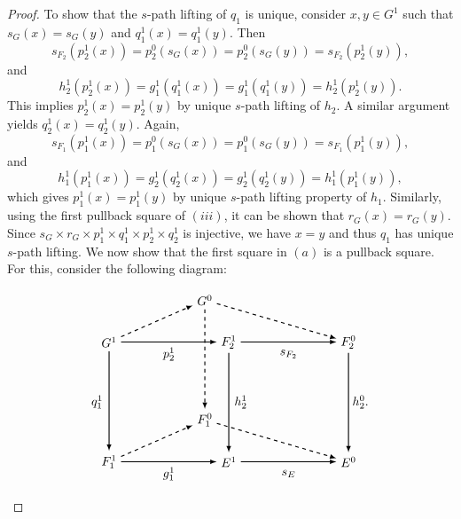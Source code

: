 \documentclass[10pt,a4paper]{amsart}
\begin{document}
\begin{proof}
To show that the $s$-path lifting of $q_1$ is unique, consider $x,y\in G^1$ such that $s_G(x)=s_G(y)$ and $q_1^1(x)=q_1^1(y)$. Then \[s_{F_2}(p_2^1(x))=p_2^0(s_G(x))=p_2^0(s_G(y))=s_{F_2}(p_2^1(y)),\] and \[h_2^1(p_2^1(x))=g_1^1(q_1^1(x))=g_1^1(q_1^1(y))=h_2^1(p_2^1(y)).\] This implies $p_2^1(x)=p_2^1(y)$ by unique $s$-path lifting of $h_2$. A similar argument yields $q_2^1(x)=q_2^1(y)$. Again, \[s_{F_1}(p_1^1(x))=p_1^0(s_G(x))=p_1^0(s_G(y))=s_{F_1}(p_1^1(y)),\] and \[h_1^1(p_1^1(x))=g_2^1(q_2^1(x))=g_2^1(q_2^1(y))=h_1^1(p_1^1(y)),\] which gives $p_1^1(x)=p_1^1(y)$ by unique $s$-path lifting property of $h_1$. Similarly, using the first pullback square of $(iii)$, it can be shown that $r_G(x)=r_G(y)$. Since $s_G\times r_G\times p_1^1\times q_1^1\times p_2^1\times q_2^1$ is injective, we have $x=y$ and thus $q_1$ has unique $s$-path lifting. We now show that the first square in $(a)$ is a pullback square. For this, consider the following diagram:

\[
\begin{tikzpicture}[scale=1.7]
\node[] (A1) at (0,0) {$G^1$};
\node[] (A2) at (2,0) {$F_2^1$};
\node[] (A3) at (0,-2) {$F_1^1$};
\node[] (A4) at (2,-2) {$E^1$};

\node[] (B1) at (1.6,0.7) {$G^0$};
\node[] (B2) at (4,0) {$F_2^0$};
\node[] (B3) at (1.6,-1.3) {$F_1^0$};
\node[] (B4) at (4,-2) {$E^0$};

\path[->, black, >=latex,thick] (A1) edge [] node[]{} (A2);
\path[->, black, >=latex,thick] (A3) edge [] node[]{} (A4);
\path[->, black, >=latex,thick] (A1) edge [] node[]{} (A3);
\path[->, black, >=latex,thick] (A2) edge [] node[]{} (A4);

\path[->,black, dashed, >=latex,thick] (B1) edge [] node[]{} (B3);
\path[->,black, >=latex,thick] (A4) edge [] node[]{} (B4);
\path[->,black, >=latex,thick] (A2) edge [] node[]{} (B2);
\path[->,black, >=latex,thick] (B2) edge [] node[]{} (B4);

\path[->,black, dashed, >=latex,thick] (A1) edge [] node {} (B1);
\path[->,black, dashed, >=latex,thick] (A3) edge [] node {} (B3);
\path[->,black, dashed, >=latex,thick] (B1) edge [] node {} (B2);
\path[->,black, dashed, >=latex,thick] (B3) edge [] node {} (B4);

\node at (1,-0.2) {$p_2^1$};
\node at (1,-2.2) {$g_1^1$};
\node at (-0.2,-1) {$q_1^1$};
\node at (2.2,-1) {$h_2^1$};

\node at (3,-0.2) {$s_{F_2}$};
\node at (3,-2.2) {$s_E$};
\node at (4.2,-1) {$h_2^0$.};


\end{tikzpicture}\]
\end{proof}
\end{document}
